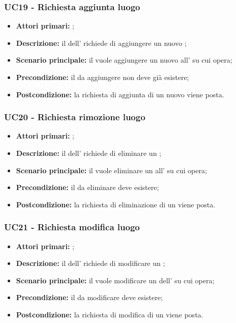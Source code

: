 \documentclass[casi-duso]{subfiles}
\begin{document}
\subsubsection{UC19 - Richiesta aggiunta luogo}
\label{subsub:UC19}
\begin{itemize}
  \item \textbf{Attori primari:} ;
  \item \textbf{Descrizione:} il  dell' richiede di aggiungere un nuovo ;
  \item \textbf{Scenario principale:} il  vuole aggiungere un nuovo  all' su cui opera;
  \item \textbf{Precondizione:} il  da aggiungere non deve già esistere;
  \item \textbf{Postcondizione:} la richiesta di aggiunta di un nuovo  viene posta.
\end{itemize}

\subsubsection{UC20 - Richiesta rimozione luogo}
\label{subsub:UC20}
\begin{itemize}
  \item \textbf{Attori primari:} ;
  \item \textbf{Descrizione:} il  dell' richiede di eliminare un ;
  \item \textbf{Scenario principale:} il  vuole eliminare un  all' su cui opera;
  \item \textbf{Precondizione:} il  da eliminare deve esistere;
  \item \textbf{Postcondizione:} la richiesta di eliminazione di un  viene posta.
\end{itemize}

\subsubsection{UC21 - Richiesta modifica luogo}
\label{subsub:UC21}
\begin{itemize}
  \item \textbf{Attori primari:} ;
  \item \textbf{Descrizione:} il  dell' richiede di modificare un ;
  \item \textbf{Scenario principale:} il  vuole modificare un  dell' su cui opera;
  \item \textbf{Precondizione:} il  da modificare deve esistere;
  \item \textbf{Postcondizione:} la richiesta di modifica di un  viene posta.
\end{itemize}
\end{document}
